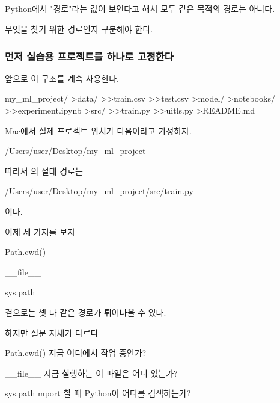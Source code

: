

\subsection{}

Python에서 "경로"라는 값이 보인다고 해서 모두 같은 목적의 경로는 아니다.

무엇을 찾기 위한 경로인지 구분해야 한다.

\subsubsection{먼저 실습용 프로젝트를 하나로 고정한다}

앞으로 이 구조를 계속 사용한다.

\begin{dhkdir}[in=9]
my_ml_project/
>data/
>>train.csv
>>test.csv
>model/
>notebooks/
>>experiment.ipynb
>src/
>>train.py
>>uitls.py
>README.md
\end{dhkdir}



Mac에서 실제 프로젝트 위치가 다음이라고 가정하자.

\begin{dhkzsh}
/Users/user/Desktop/my_ml_project
\end{dhkzsh}

따라서 의 절대 경로는

\begin{dhkzsh}
/Users/user/Desktop/my_ml_project/src/train.py
\end{dhkzsh}

이다.

이제 세 가지를 보자

\begin{dhksmry}[centered]
Path.cwd()

__file__

sys.path
\end{dhksmry}

겉으로는 셋 다 같은 경로가 튀어나올 수 있다.

하지만 질문 자체가 다르다
\begin{dhknote}
\begin{dhksmry}[centered]
Path.cwd()
지금 어디에서 작업 중인가?


__file__
지금 실행하는 이 파일은 어디 있는가?


sys.path
mport 할 때 Python이 어디를 검색하는가?
\end{dhksmry}
\end{dhknote}

